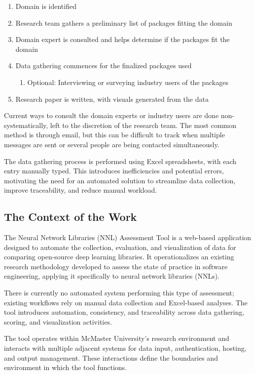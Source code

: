 \documentclass[12pt]{article}
\begin{document}
\begin{enumerate}
    \item Domain is identified
    \item Research team gathers a preliminary list of packages fitting the domain
    \item Domain expert is consulted and helps determine if the packages fit the domain
    \item Data gathering commences for the finalized packages used
        \begin{enumerate}
            \item Optional: Interviewing or surveying industry users of the packages
        \end{enumerate}
    \item Research paper is written, with visuals generated from the data
\end{enumerate}

Current ways to consult the domain experts or industry users are done non-systematically, left to the discretion of the research team. The most common method is through email, but this can be difficult to track when multiple messages are sent or several people are being contacted simultaneously.

The data gathering process is performed using Excel spreadsheets, with each entry manually typed. This introduces inefficiencies and potential errors, motivating the need for an automated solution to streamline data collection, improve traceability, and reduce manual workload.

\subsection{The Context of the Work}
The Neural Network Libraries (NNL) Assessment Tool is a web-based application designed to automate the collection, evaluation, and visualization of data for comparing open-source deep learning libraries. It operationalizes an existing research methodology developed to assess the state of practice in software engineering, applying it specifically to neural network libraries (NNLs).

There is currently no automated system performing this type of assessment; existing workflows rely on manual data collection and Excel-based analyses. The tool introduces automation, consistency, and traceability across data gathering, scoring, and visualization activities.

The tool operates within McMaster University’s research environment and interacts with multiple adjacent systems for data input, authentication, hosting, and output management. These interactions define the boundaries and environment in which the tool functions.
\end{document}
